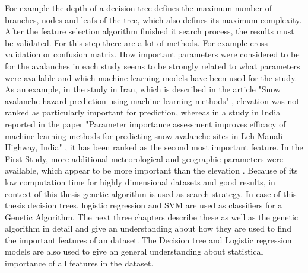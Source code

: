\documentclass[../masterarbeit.tex]{subfiles}
\begin{document}
For example the depth of a decision tree defines the maximum number of branches, nodes and leafs of the tree, which also defines its maximum complexity.
After the feature selection algorithm finished it search process, the results must be validated. For this step there are a lot of methods. For example cross validation or confusion matrix. \autocite[]{VenkateshAnuradha:2019}
How important parameters were considered to be for the avalanches in each study seems to be strongly related to what parameters were available and which machine learning models have been used for the study. 
As an example, in the study in Iran, which is described in the article "Snow avalanche hazard prediction using machine learning methods" \textcite[]{Bahram:2019}, elevation was not ranked as particularly important for prediction, whereas in a study in India reported in the paper "Parameter importance assessment improves efficacy of machine learning methods for predicting snow avalanche sites in Leh-Manali Highway, India" \textcite[][]{Tiwari:2021}, it has been ranked as the second most important feature. 
In the First Study, more additional meteorological and geographic parameters were available, which appear to be more important than the elevation \textcite[]{Bahram:2019} \textcite[]{Tiwari:2021}.
Because of its low computation time for highly dimensional datasets and good results, in context of this thesis genetic algorithm is used as search strategy.  
In case of this thesis decision trees, logistic regression and SVM are used as classifiers for a Genetic Algorithm. The next three chapters describe these as well as the genetic algorithm in detail and give an understanding about how they are used to find the important features of an dataset. The Decision tree and Logistic regression models are also used to give an general understanding about statistical importance of all features in the dataset.
\end{document}
